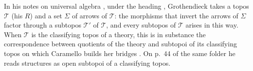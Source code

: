 In his notes on universal algebra \cite[p.~17]{grothendieck-161-2}, under the heading , Grothendieck takes a topos $\mathcal T$ (his $R$) and a set $\Sigma$ of arrows of $\mathcal T$: the morphisms that invert the arrows of $\Sigma$ factor through a subtopos $\mathcal T'$ of $\mathcal T$, and every subtopos of $\mathcal T$ arises in this way. When $\mathcal T$ is the classifying topos of a theory, this is in substance the correspondence between quotients of the theory and subtopoi of its classifying topos on which Caramello builds her bridges \cite{caramello-tst}. On p.~44 of the same folder he reads structures as open subtopoi of a classifying topos.
